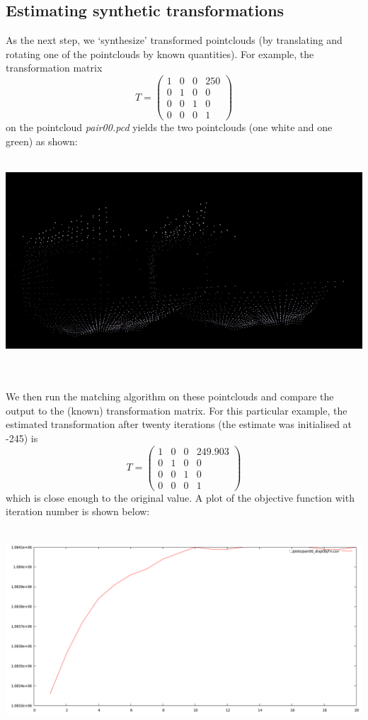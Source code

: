 \documentclass[11pt, a4paper]{article}
\begin{document}
\subsection{Estimating synthetic transformations} 
As the next step, we `synthesize' transformed pointclouds (by translating and rotating one of the pointclouds by known quantities). For example, the transformation matrix
$$T = \begin{pmatrix}
 1 & 0 & 0 & 250 \\
 0 & 1 & 0 & 0 \\
 0 & 0 & 1 & 0 \\
 0 & 0 & 0 & 1
\end{pmatrix}$$
on the pointcloud \textit{pair00.pcd} yields the two pointclouds (one white and one green) as shown: \\ \\
\centerline{\includegraphics[scale=0.5]{dispSynthPair}} \\ \\
We then run the matching algorithm on these pointclouds and compare the output to the (known) transformation matrix. For this particular example, the estimated transformation after twenty iterations (the estimate was initialised at -245) is
$$T = \begin{pmatrix}
 1 & 0 & 0 & 249.903 \\
 0 & 1 & 0 & 0 \\
 0 & 0 & 1 & 0 \\
 0 & 0 & 0 & 1
\end{pmatrix}$$
which is close enough to the original value. A plot of the objective function with iteration number is shown below: \\ \\
\centerline{\includegraphics[scale=0.35]{pair00_dispObjFn}} \\ \\
\end{document}
